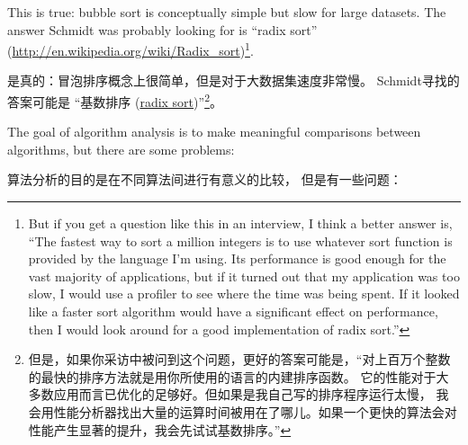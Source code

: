 This is true: bubble sort is conceptually simple but slow for
large datasets.  The answer Schmidt was probably looking for is
``radix sort'' (\url{http://en.wikipedia.org/wiki/Radix_sort})\footnote{
But if you get a question like this in an interview, I think
a better answer is, ``The fastest way to sort a million integers
is to use whatever sort function is provided by the language
I'm using.  Its performance is good enough for the vast majority
of applications, but if it turned out that my application was too
slow, I would use a profiler to see where the time was being
spent.  If it looked like a faster sort algorithm would have
a significant effect on performance, then I would look
around for a good implementation of radix sort.''}.

是真的：冒泡排序概念上很简单，但是对于大数据集速度非常慢。
Schmidt寻找的答案可能是 ``基数排序 (\href{http://en.wikipedia.org/wiki/Radix_sort}{radix sort})''\footnote{但是，如果你采访中被问到这个问题，更好的答案可能是，``对上百万个整数的最快的排序方法就是用你所使用的语言的内建排序函数。 它的性能对于大多数应用而言已优化的足够好。但如果是我自己写的排序程序运行太慢， 我会用性能分析器找出大量的运算时间被用在了哪儿。如果一个更快的算法会对性能产生显著的提升，我会先试试基数排序。''}。

The goal of algorithm analysis is to make meaningful
comparisons between algorithms, but there are some problems:

算法分析的目的是在不同算法间进行有意义的比较， 但是有一些问题：

